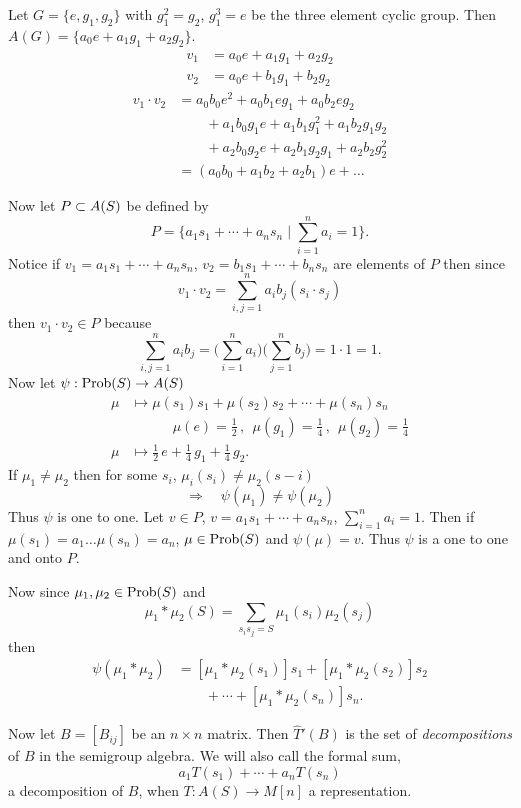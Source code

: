 \begin{example}		\label{exm:3.6} 
Let $G = \{ e,g_1,g_2 \}$ with $g^2_1 = g_2$, $g^3_1 = e$ be the three element cyclic group.  
Then $A(G) = \{ a_0e + a_1g_1 + a_2g_2 \}$.
\[
\begin{aligned}
       v_1 &= a_0e + a_1g_1 + a_2g_2               \\
       v_2 &= a_0e + b_1g_1 + b_2g_2
\end{aligned}
\]
\[
\begin{aligned}
       v_1 \cdot v_2 &= a_0b_0e^2 + a_0b_1eg_1 + a_0b_2eg_2    \\
       &\qquad + a_1b_0g_1e + a_1b_1g^2_1 + a_1b_2g_1g_2       \\
       &\qquad + a_2b_0g_2e + a_2b_1g_2g_1 + a_2b_2g^2_2       \\
       &= (a_0b_0 + a_1b_2 + a_2b_1)e + \ldots
\end{aligned}
\]

     Now let $P \subset A(S)$ be defined by
\[
     P = \bigg\{ a_1s_1 + \cdots + a_ns_n \mid
               \sum^n_{i=1} a_i = 1 \bigg\} .
\]
Notice if $v_1 = a_1s_1 + \cdots + a_ns_n$, $v_2 = b_1s_1 + \cdots +
b_ns_n$ are elements of $P$ then since
\[
     v_1 \cdot v_2 = \sum^n_{i,j=1} a_ib_j (s_i \cdot s_j)
\]
then $v_1 \cdot v_2 \in P$ because
\[
     \sum^n_{i,j=1} a_ib_j = \bigg( \sum^n_{i=1} a_i \bigg)
          \bigg( \sum^n_{j=1} b_j \bigg) = 1 \cdot 1 = 1.
\]
Now let $\psi: \hbox{Prob}(S) \to A(S)$
\[
\begin{aligned}
       \mu &\mapsto \mu(s_1)s_1 + \mu(s_2)s_2 +\cdots + \mu(s_n)s_n \\
       &\qquad \quad \mu(e) = \frac{1}{2}\,, \ \
               \mu(g_1) = \frac{1}{4}\,,\ \
               \mu(g_2) = \frac{1}{4}                          \\
       \mu &\mapsto \frac{1}{2} \, e + \frac{1}{4}\, g_1
               + \frac{1}{4} \, g_2.
\end{aligned}
\]
If $\mu_1 \not= \mu_2$ then for some $s_i$, $\mu_i(s_i) \not=
\mu_2(s-i)$
\[
     \Rightarrow \quad \psi(\mu_1) \not= \psi(\mu_2)
\]
Thus $\psi$ is one to one.  Let $v \in P$, $v = a_1s_1 + \cdots +
a_ns_n$, $\sum\limits^n_{i=1} a_i = 1$.  Then if $\mu(s_1) = a_1
\ldots \mu(s_n) = a_n$, $\mu \in \hbox{Prob}(S)$ and $\psi(\mu) = v$.  Thus
$\psi$ is a one to one and onto $P$.

     Now since $\mu_1,\mu_2 \in \hbox{Prob}(S)$ and
\[
     \mu_1 * \mu_2(S) = \sum_{s_is_j=S} \mu_1(s_i) \mu_2(s_j)
\]
then
\[
\begin{aligned}
       \psi(\mu_1 * \mu_2) &= [\mu_1 * \mu_2(s_1)] s_1
               + [\mu_1 * \mu_2(s_2)] s_2          \\
       & \qquad + \cdots + [\mu_1 * \mu_2(s_n)]s_n.
\end{aligned}
\]

     Now let $B = [B_{ij}]$ be an $n \times n$ matrix.  Then $\hat T'(B)$
is the set of {\sl decompositions} of $B$ in the semigroup algebra.
We will also call the formal sum,
\[
     a_1T(s_1) + \cdots + a_nT(s_n)
\]
a decomposition of $B$, when $T : A(S) \to M[n]$ a representation.
\end{example}

